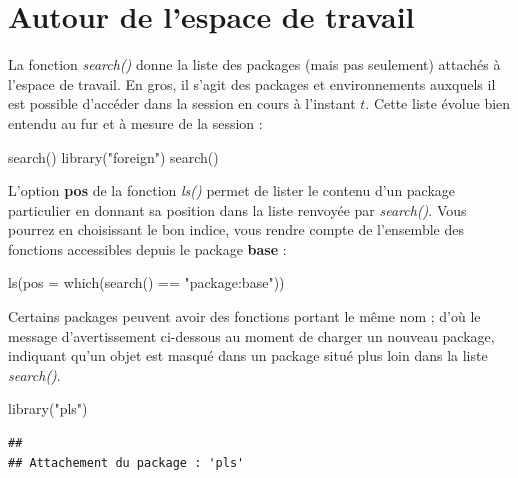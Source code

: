\documentclass[
]{book}
\newenvironment{Shaded}{\begin{snugshade}}{\end{snugshade}}
\newcommand{\AttributeTok}[1]{\textcolor[rgb]{0.77,0.63,0.00}{#1}}
\newcommand{\FunctionTok}[1]{\textcolor[rgb]{0.00,0.00,0.00}{#1}}
\newcommand{\NormalTok}[1]{#1}
\newcommand{\SpecialCharTok}[1]{\textcolor[rgb]{0.00,0.00,0.00}{#1}}
\newcommand{\StringTok}[1]{\textcolor[rgb]{0.31,0.60,0.02}{#1}}
\theoremstyle{definition}
\theoremstyle{definition}
\theoremstyle{definition}
\theoremstyle{definition}
\theoremstyle{remark}
\begin{document}
\hypertarget{autour-de-lespace-de-travail}{%
\section{Autour de l'espace de travail}\label{autour-de-lespace-de-travail}}

La fonction \emph{search()} donne la liste des packages (mais pas seulement) attachés à l'espace de travail. En gros, il s'agit des packages et environnements auxquels il est possible d'accéder dans la session en cours à l'instant \(t\). Cette liste évolue bien entendu au fur et à mesure de la session :

\begin{Shaded}
\begin{Highlighting}[]
\FunctionTok{search}\NormalTok{()}
\FunctionTok{library}\NormalTok{(}\StringTok{"foreign"}\NormalTok{)}
\FunctionTok{search}\NormalTok{()}
\end{Highlighting}
\end{Shaded}

L'option \textbf{pos} de la fonction \emph{ls()} permet de lister le contenu d'un package particulier en donnant sa position dans la liste renvoyée par \emph{search()}. Vous pourrez en choisissant le bon indice, vous rendre compte de l'ensemble des fonctions accessibles depuis le package \textbf{base} :

\begin{Shaded}
\begin{Highlighting}[]
\FunctionTok{ls}\NormalTok{(}\AttributeTok{pos =} \FunctionTok{which}\NormalTok{(}\FunctionTok{search}\NormalTok{() }\SpecialCharTok{==} \StringTok{"package:base"}\NormalTok{))}
\end{Highlighting}
\end{Shaded}

Certains packages peuvent avoir des fonctions portant le même nom ; d'où le message d'avertissement ci-dessous au moment de charger un nouveau package, indiquant qu'un objet est masqué dans un package situé plus loin dans la liste \emph{search()}.

\begin{Shaded}
\begin{Highlighting}[]
\FunctionTok{library}\NormalTok{(}\StringTok{"pls"}\NormalTok{)}
\end{Highlighting}
\end{Shaded}

\begin{verbatim}
## 
## Attachement du package : 'pls'
\end{verbatim}
\end{document}
